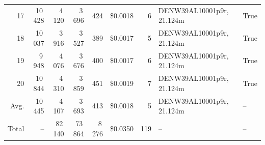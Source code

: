 \documentclass[a4paper,11pt]{article}
\begin{document}
\begin{table}[ht]
\begin{tabular}{r r r r r r r p{3cm} l}
17 & 10\,428 & 4\,120 & 3\,696 & 424 & \$0.0018 & 6 & DENW39AL10001p9r, 21.124m & True \\
18 & 10\,037 & 3\,916 & 3\,527 & 389 & \$0.0017 & 5 & DENW39AL10001p9r, 21.124m & True \\
19 & 9\,948 & 4\,076 & 3\,676 & 400 & \$0.0017 & 6 & DENW39AL10001p9r, 21.124m & True \\
20 & 10\,844 & 4\,310 & 3\,859 & 451 & \$0.0019 & 7 & DENW39AL10001p9r, 21.124m & True \\
\hline
Avg. & 10\,445 & 4\,107 & 3\,693 & 413 & \$0.0018 & 5 & DENW39AL10001p9r, 21.124m & -- \\
Total & -- & 82\,140 & 73\,864 & 8\,276 & \$0.0350 & 119 & -- & -- \\
\hline
\end{tabular}
\end{table}

\clearpage
\end{document}

